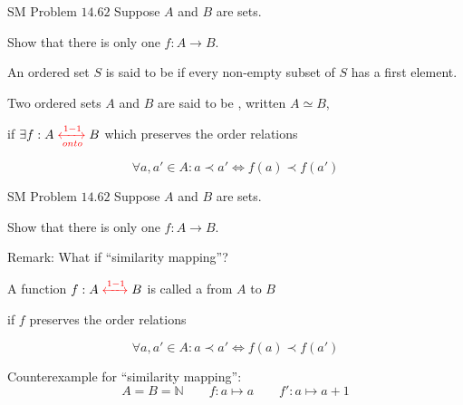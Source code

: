 \begin{frame}{}
  \begin{exampleblock}{SM Problem $14.62$}
    Suppose $A$ and $B$ are   sets. 
    
    Show that there is only one  $f : A \to B$.
  \end{exampleblock}

  \pause
  \vspace{0.50cm}
  \begin{definition}
    An ordered set $S$ is said to be  if every non-empty subset of $S$ has a first element.
  \end{definition}

  \pause
  \vspace{0.50cm}
  \begin{definition}[Isomorphic]
    Two ordered sets $A$ and $B$ are said to be , written $A \simeq B$, 

    if $\exists f: A \textcolor{red}{\;\xleftrightarrow[onto]{1-1}\;} B$ which preserves the order relations

    \[
      \forall a, a' \in A: a \prec a' \iff f(a) \prec f(a')
    \]
  \end{definition}
\end{frame}

\begin{frame}{}
  \begin{exampleblock}{SM Problem $14.62$}
    Suppose $A$ and $B$ are   sets. 
    
    Show that there is only one  $f : A \to B$.
  \end{exampleblock}

  \vspace{0.50cm}
  \begin{alertblock}{Remark: What if ``similarity mapping''?}
    \pause
    \begin{definition}
      A function $f: A \textcolor{red}{\;\xleftrightarrow{1-1}\;} B$ is called a  from $A$ to $B$ 

      if $f$ preserves the order relations

      \[
	\forall a, a' \in A: a \prec a' \iff f(a) \prec f(a')
      \]
    \end{definition}

    \pause
    \begin{exampleblock}{Counterexample for ``similarity mapping'':}
      \pause
      \[
	A = B = \mathbb{N}  \qquad f: a \mapsto a  \qquad f': a \mapsto a + 1
      \]
    \end{exampleblock}
  \end{alertblock}
\end{frame}

